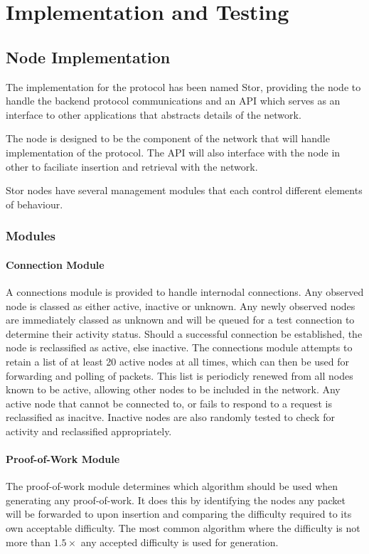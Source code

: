 \section{Implementation and Testing}
	\subsection{Node Implementation}
		The implementation for the protocol has been named Stor, providing the node to handle the backend protocol communications and an API which serves as an interface to other applications that abstracts details of the network.
	
		The node is designed to be the component of the network that will handle implementation of the protocol. The API will also interface with the node in other to faciliate insertion and retrieval with the network.
		
		Stor nodes have several management modules that each control different elements of behaviour.
		\subsubsection*{Modules}
			\paragraph*{Connection Module}
				A connections module is provided to handle internodal connections. Any observed node is classed as either active, inactive or unknown. Any newly observed nodes are immediately classed as unknown and will be queued for a test connection to determine their activity status. Should a successful connection be established, the node is reclassified as active, else inactive. The connections module attempts to retain a list of at least 20 active nodes at all times, which can then be used for forwarding and polling of packets. This list is periodicly renewed from all nodes known to be active, allowing other nodes to be included in the network. Any active node that cannot be connected to, or fails to respond to a request is reclassified as inacitve. Inactive nodes are also randomly tested to check for activity and reclassified appropriately.
			\paragraph{Proof-of-Work Module}
				The proof-of-work module determines which algorithm should be used when generating any proof-of-work. It does this by identifying the nodes any packet will be forwarded to upon insertion and comparing the difficulty required to its own acceptable difficulty. The most common algorithm where the difficulty is not more than $1.5\times$ any accepted difficulty is used for generation.
